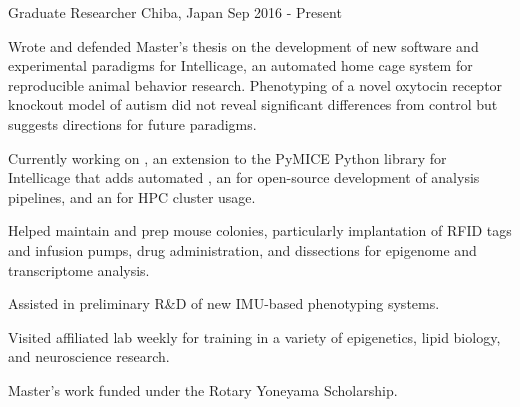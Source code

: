 \vspace*{0.35cm}

\begin{cventries}

    {Graduate Researcher}
    {Chiba, Japan}
    {Sep 2016 - Present}
    {\begin{cvitems}
        \item{
            {Wrote} and 
            {defended} Master's thesis on the development of new software and
            experimental paradigms for Intellicage, an automated home cage system for
            reproducible animal behavior research. Phenotyping of a novel oxytocin
            receptor knockout model of autism did not reveal significant differences
            from control but suggests directions for future paradigms.\vspace*{0.1cm}}
        \item{Currently working on , an extension to the
            PyMICE Python library for Intellicage that adds automated , an
             for
            open-source development of analysis pipelines, and an  for HPC cluster
            usage.\vspace*{0.1cm}}
        \item{Helped maintain and prep mouse colonies, particularly implantation of RFID
            tags and infusion pumps, drug administration, and dissections for epigenome
            and transcriptome analysis.\vspace*{0.1cm}}
        \item{Assisted in preliminary R\&D of new IMU-based phenotyping
            systems.\vspace*{0.1cm}}
        \item{Visited 
            {affiliated lab} weekly for training in a variety of epigenetics, lipid
            biology, and neuroscience research.\vspace*{0.1cm}}
        \item{Master's work funded under the Rotary Yoneyama 
            {Scholarship}.}
    \end{cvitems}}
    \vspace*{0.2cm}
    

\end{cventries}
